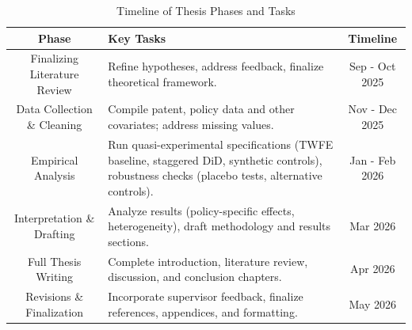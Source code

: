 \documentclass[12pt]{article}
\begin{document}
\begin{table}[h]
    \centering
    \caption{Timeline of Thesis Phases and Tasks}
    \label{tab:thesis_timeline}
    \vspace{0.5cm}
    \begin{tabularx}{\textwidth}{|c|X|c|}
        \hline
        \textbf{Phase} & \textbf{Key Tasks} & \textbf{Timeline} \\
        \hline
        Finalizing Literature Review & Refine hypotheses, address feedback, finalize theoretical framework. & Sep - Oct 2025 \\
        \hline
        Data Collection \& Cleaning & Compile patent, policy data and other covariates; address missing values. & Nov - Dec 2025 \\
        \hline
        Empirical Analysis & Run quasi-experimental specifications (TWFE baseline, staggered DiD, synthetic controls), robustness checks (placebo tests, alternative controls). & Jan - Feb 2026 \\
        \hline
        Interpretation \& Drafting & Analyze results (policy-specific effects, heterogeneity), draft methodology and results sections. & Mar 2026 \\
        \hline
        Full Thesis Writing & Complete introduction, literature review, discussion, and conclusion chapters. & Apr 2026 \\
        \hline
        Revisions \& Finalization & Incorporate supervisor feedback, finalize references, appendices, and formatting. & May 2026 \\
        \hline
    \end{tabularx}
\end{table}

\newpage

\printbibliography
\end{document}
